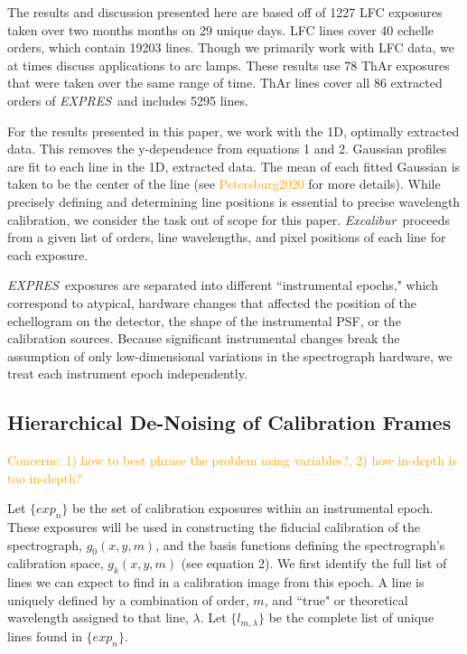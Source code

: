 \documentclass[twocolumn]{aastex63}
\newcommand{\lz}[1]{\textcolor{orange}{#1}}
\newcommand{\project}[1]{\textsl{#1}}
\newcommand{\name}{\project{Excalibur}}
\newcommand{\acronym}[1]{{\small{#1}}}
\newcommand{\expres}{\project{\acronym{EXPRES}}}
\begin{document}
The results and discussion presented here are based off of 1227 LFC exposures taken over two months months on 29 unique days.  LFC lines cover 40 echelle orders, which contain 19203 lines.  Though we primarily work with LFC data, we at times discuss applications to arc lamps.  These results use 78 ThAr exposures that were taken over the same range of time.  ThAr lines cover all 86 extracted orders of \expres\ and includes 5295 lines.

For the results presented in this paper, we work with the 1D, optimally extracted data.  This removes the y-dependence from equations 1 and 2.  Gaussian profiles are fit to each line in the 1D, extracted data.  The mean of each fitted Gaussian is taken to be the center of the line (see \lz{Petersburg2020} for more details).  While precisely defining and determining line positions is essential to precise wavelength calibration, we consider the task out of scope for this paper.  \name\ proceeds from a given list of orders, line wavelengths, and pixel positions of each line for each exposure.

\expres\ exposures are separated into different ``instrumental epochs," which correspond to atypical, hardware changes that affected the position of the echellogram on the detector, the shape of the instrumental PSF, or the calibration sources.  Because significant instrumental changes break the assumption of only low-dimensional variations in the spectrograph hardware, we treat each instrument epoch independently.

\subsection{Hierarchical De-Noising of Calibration Frames} \label{sec:denoising}
\lz{Concerns: 1) how to best phrase the problem using variables?, 2) how in-depth is too in-depth?}

Let $\{exp_n\}$ be the set of calibration exposures within an instrumental epoch.  These exposures will be used in constructing the fiducial calibration of the spectrograph, $g_0(x,y,m)$, and the basis functions defining the spectrograph's calibration space, $g_k(x,y,m)$ (see equation 2).  We first identify the full list of lines we can expect to find in a calibration image from this epoch.  A line is uniquely defined by a combination of order, $m$, and ``true" or theoretical wavelength assigned to that line, $\lambda$.  Let $\{l_{m,\lambda}\}$ be the complete list of unique lines found in $\{exp_n\}$.
\end{document}
